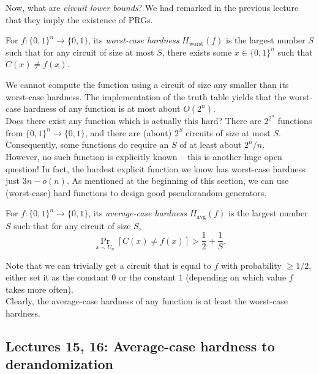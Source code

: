 		Now, what are \emph{circuit lower bounds}? We had remarked in the previous lecture that they imply the existence of PRGs.

		\begin{fdef}
			For $f : \{0,1\}^n \to \{0,1\}$, its \emph{worst-case hardness} $H_\text{worst}(f)$ is the largest number $S$ such that for any circuit of size at most $S$, there exists some $x \in \{0,1\}^n$ such that $C(x) \ne f(x)$. 
		\end{fdef}
		We cannot compute the function using a circuit of size any smaller than its worst-case hardness. The implementation of the truth table yields that the worst-case hardness of any function is at most about $O(2^n)$. \\
		
		Does there exist any function which is actually this hard? There are $2^{2^n}$ functions from $\{0,1\}^n \to \{0,1\}$, and there are (about) $2^S$ circuits of size at most $S$. Consequently, some functions do require an $S$ of at least about $2^n/n$.\\
		However, no such function is explicitly known -- this is another huge open question! In fact, the hardest explicit function we know has worst-case hardness just $3n - o(n)$. %
		As mentioned at the beginning of this section, we can use (worst-case) hard functions to design good pseudorandom generators.

		\begin{fdef}
			For $f : \{0,1\}^n \to \{0,1\}$, its \emph{average-case hardness} $H_\text{avg}(f)$ is the largest number $S$ such that for any circuit of size $S$,
			\[ \Pr_{x \sim U_n} \left[ C(x) \ne f(x) \right] > \frac{1}{2} + \frac{1}{S}. \]
		\end{fdef}
		Note that we can trivially get a circuit that is equal to $f$ with probability $\ge 1/2$, either set it as the constant $0$ or the constant $1$ (depending on which value $f$ takes more often).\\
		Clearly, the average-case hardness of any function is at least the worst-case hardness.

\subsection{Lectures 15, 16: Average-case hardness to derandomization}

